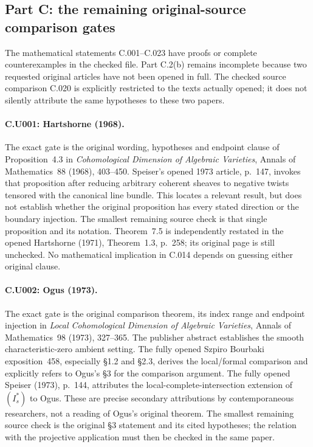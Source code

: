 \subsection{Part C: the remaining original-source comparison gates}
The mathematical statements C.001--C.023 have proofs or complete
counterexamples in the checked file. Part C.2(b) remains incomplete
because two requested original articles have not been opened in full.
The checked source comparison C.020 is explicitly restricted to the
texts actually opened; it does not silently attribute the same
hypotheses to these two papers.

\paragraph{C.U001: Hartshorne (1968).}
The exact gate is the original wording, hypotheses and endpoint
clause of Proposition~4.3 in \emph{Cohomological Dimension of
Algebraic Varieties}, Annals of Mathematics~88 (1968), 403--450.
Speiser's opened 1973 article, p.~147, invokes that proposition
after reducing arbitrary coherent sheaves to negative twists
tensored with the canonical line bundle. This locates a relevant
result, but does not establish whether the original proposition
has every stated direction or the boundary injection. The smallest
remaining source check is that single proposition and its notation.
Theorem~7.5 is independently restated in the opened Hartshorne
(1971), Theorem~1.3, p.~258; its original page is still unchecked.
No mathematical implication in C.014 depends on guessing either
original clause.

\paragraph{C.U002: Ogus (1973).}
The exact gate is the original comparison theorem, its index
range and endpoint injection in \emph{Local Cohomological
Dimension of Algebraic Varieties}, Annals of Mathematics~98
(1973), 327--365. The publisher abstract establishes the
smooth characteristic-zero ambient setting. The fully opened
Szpiro Bourbaki exposition~458, especially \S1.2 and \S2.3,
derives the local/formal comparison and explicitly refers to
Ogus's \S3 for the comparison argument. The fully opened
Speiser (1973), p.~144, attributes the local-complete-intersection
extension of $(I_s^*)$ to Ogus. These are precise secondary
attributions by contemporaneous researchers, not a reading of
Ogus's original theorem. The smallest remaining source check
is the original \S3 statement and its cited hypotheses; the
relation with the projective application must then be checked
in the same paper.

